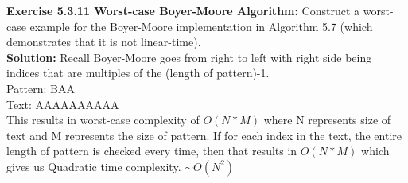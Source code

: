 \documentclass[11pt,fleqn]{article}
\begin{document}
\textbf{Exercise 5.3.11 Worst-case Boyer-Moore Algorithm:} Construct a worst-case example for the Boyer-Moore implementation in Algorithm
5.7 (which demonstrates that it is not linear-time).\\

\textbf{Solution:} Recall Boyer-Moore goes from right to left with right side being indices that are multiples of the (length of pattern)-1.\\

Pattern: BAA\\
Text: AAAAAAAAAA\\

This results in worst-case complexity of $O(N*M)$ where N represents size of text and M represents the size of pattern. If for each index in the text, the entire length of pattern is checked every time, then that results in $O(N*M)$ which gives us Quadratic time complexity. $\sim O(N^2)$
\end{document}
